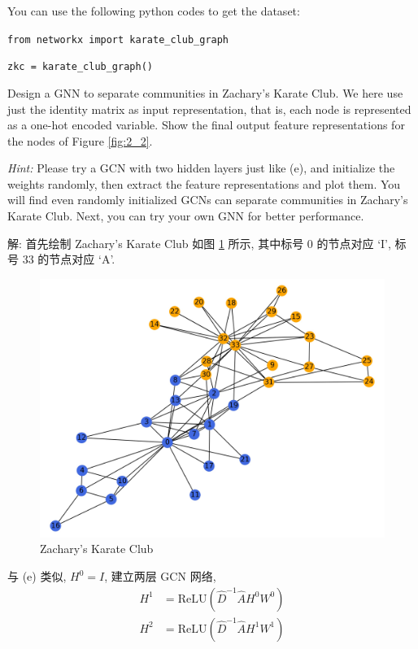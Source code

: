 \documentclass{article}
\begin{document}
You can use the following python codes to get the dataset:

\verb|from networkx import karate_club_graph|

\verb|zkc = karate_club_graph()|

Design a GNN to separate communities in Zachary's Karate Club. We here use just the identity matrix as input representation, that is, each node is represented as a one-hot encoded variable. Show the final output feature representations for the nodes of Figure \ref{fig:2_2}. 

\emph{Hint:} Please try a GCN with two hidden layers just like (e), and initialize the weights randomly, then extract the feature representations and plot them. You will find even randomly initialized GCNs can separate communities in Zachary's Karate Club. Next, you can try your own GNN for better performance.

解: 首先绘制 Zachary's Karate Club 如图 \ref{fig:zkc_init} 所示, 其中标号 0 的节点对应 `I', 标号 33 的节点对应 `A'.

\begin{figure}[htbp]
  \centering
  \includegraphics[width=12cm]{zkc_init.jpg}
  \caption{Zachary's Karate Club}
  \label{fig:zkc_init}
\end{figure}

与 (e) 类似, $H^0=I$, 建立两层 GCN 网络, 
\begin{equation}
  \begin{aligned}
    H^1 &=\mathrm{ReLU}(\hat{D}^{-1}\hat{A}H^0W^0)\\
    H^2 &=\mathrm{ReLU}(\hat{D}^{-1}\hat{A}H^1W^1)\\
  \end{aligned}
\end{equation}
\end{document}
